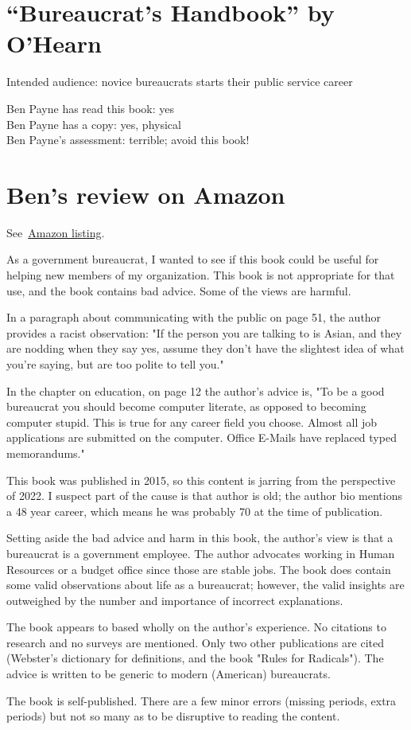 \section{``Bureaucrat's Handbook'' by O'Hearn\label{review:ohearn_handbook}}

\cite{2015_OHearn}

Intended audience: novice bureaucrats starts their public service career

Ben Payne has read this book: yes\\
Ben Payne has a copy: yes, physical\\
Ben Payne's assessment: terrible; avoid this book!

\section{Ben's review on Amazon}

See~\href{https://www.amazon.com/Bureaucrats-Handbook-Step-Step-Bureaucracy/dp/1508995877}{Amazon listing}.


As a government bureaucrat, I wanted to see if this book could be useful for helping new members of my organization. This book is not appropriate for that use, and the book contains bad advice. Some of the views are harmful. 

In a paragraph about communicating with the public on page 51, the author provides a racist observation: "If the person you are talking to is Asian, and they are nodding when they say yes, assume they don't have the slightest idea of what you're saying, but are too polite to tell you."

In the chapter on education, on page 12 the author's advice is, "To be a good bureaucrat you should become computer literate, as opposed to becoming computer stupid. This is true for any career field you choose. Almost all job applications are submitted on the computer. Office E-Mails have replaced typed memorandums." 

This book was published in 2015, so this content is jarring from the perspective of 2022. I suspect part of the cause is that author is old; the author bio mentions a 48 year career, which means he was probably 70 at the time of publication.

Setting aside the bad advice and harm in this book, the author's view is that a bureaucrat is a government employee. The author advocates working in Human Resources or a budget office since those are stable jobs. The book does contain some valid observations about life as a bureaucrat; however, the valid insights are outweighed by the number and importance of incorrect explanations. 

The book appears to based wholly on the author's experience. No citations to research and no surveys are mentioned. Only two other publications are cited (Webster's dictionary for definitions, and the book "Rules for Radicals").  The advice is written to be generic to modern (American) bureaucrats. 

The book is self-published. There are a few minor errors (missing periods, extra periods) but not so many as to be disruptive to reading the content. 
